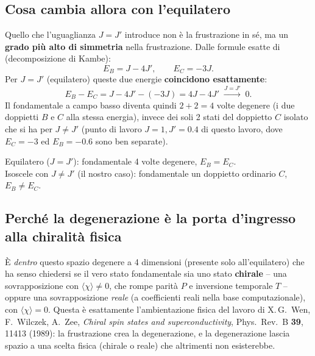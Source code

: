 \documentclass[11pt,a4paper]{article}
\begin{document}
\subsection{Cosa cambia allora con l'equilatero}

Quello che l'uguaglianza $J=J'$ introduce non è la frustrazione in sé, ma
un \textbf{grado più alto di simmetria} nella frustrazione. Dalle formule
esatte di \texttt{} (decomposizione di Kambe):
\begin{equation}
E_B = J-4J', \qquad E_C = -3J.
\end{equation}
Per $J=J'$ (equilatero) queste due energie \textbf{coincidono
esattamente}:
\begin{equation}
E_B - E_C = J-4J'-(-3J) = 4J-4J' \;\xrightarrow{J=J'}\; 0.
\end{equation}
Il fondamentale a campo basso diventa quindi $2+2=4$ volte degenere (i due
doppietti $B$ e $C$ alla stessa energia), invece dei soli 2 stati del
doppietto $C$ isolato che si ha per $J\neq J'$ (punto di lavoro
$J{=}1,J'{=}0.4$ di questo lavoro, dove $E_C=-3$ ed $E_B=-0.6$ sono ben
separate).

\begin{keyeq}
\centering
Equilatero ($J=J'$): fondamentale 4 volte degenere, $E_B=E_C$.\\
Isoscele con $J\neq J'$ (il nostro caso): fondamentale un doppietto
ordinario $C$, $E_B\neq E_C$.
\end{keyeq}

\subsection{Perché la degenerazione è la porta d'ingresso alla chiralità fisica}

È \emph{dentro} questo spazio degenere a 4 dimensioni (presente solo
all'equilatero) che ha senso chiedersi se il vero stato fondamentale sia
uno stato \textbf{chirale} -- una sovrapposizione con
$\langle\chi\rangle\neq0$, che rompe parità $P$ e inversione temporale
$T$ -- oppure una sovrapposizione \emph{reale} (a coefficienti reali
nella base computazionale), con $\langle\chi\rangle=0$. Questa è
esattamente l'ambientazione fisica del lavoro di X.\,G.\ Wen, F.\
Wilczek, A.\ Zee, \emph{Chiral spin states and superconductivity}, Phys.\
Rev.\ B \textbf{39}, 11413 (1989): la frustrazione crea la degenerazione,
e la degenerazione lascia spazio a una scelta fisica (chirale o reale)
che altrimenti non esisterebbe.
\end{document}
